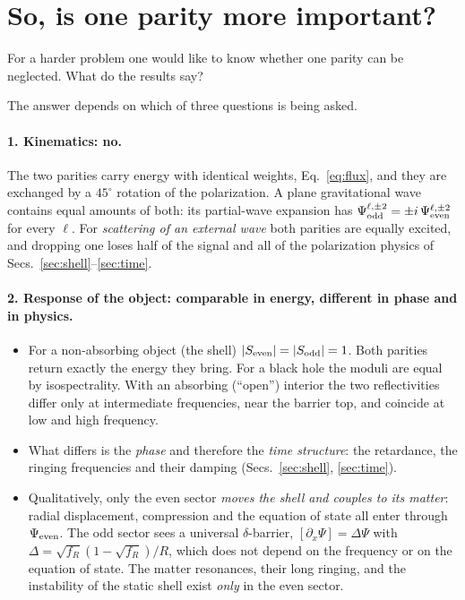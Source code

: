 \section{So, is one parity more important?}\label{sec:which}
\begin{question}
For a harder problem one would like to know whether one parity can be neglected. What do the results say?
\end{question}
The answer depends on which of three questions is being asked.

\paragraph{1. Kinematics: no.} The two parities carry energy with identical weights, Eq.~\eqref{eq:flux}, and they are
exchanged by a $45^\circ$ rotation of the polarization. A plane gravitational wave contains equal amounts of both: its
partial-wave expansion has $\Psi^{\ell,\pm2}_{\rm odd}=\pm i\,\Psi^{\ell,\pm2}_{\rm even}$ for every $\ell$. For \emph{scattering of an
external wave} both parities are equally excited, and dropping one loses half of the signal and all of the
polarization physics of Secs.~\ref{sec:shell}--\ref{sec:time}.

\paragraph{2. Response of the object: comparable in energy, different in phase and in physics.}
\begin{itemize}
\item For a non-absorbing object (the shell) $|S_{\rm even}|=|S_{\rm odd}|=1$. Both parities return exactly the energy they
bring. For a black hole the moduli are equal by isospectrality. With an absorbing (``open'') interior the two
reflectivities differ only at intermediate frequencies, near the barrier top, and coincide at low and high frequency.
\item What differs is the \emph{phase} and therefore the \emph{time structure}: the retardance, the ringing frequencies and
their damping (Secs.~\ref{sec:shell}, \ref{sec:time}).
\item Qualitatively, only the even sector \emph{moves the shell and couples to its matter}: radial displacement,
compression and the equation of state all enter through $\Psi_{\rm even}$. The odd sector sees a universal $\delta$-barrier,
$[\partial_x\Psi]=\Delta\Psi$ with $\Delta=\sqrt{f_R}(1-\sqrt{f_R})/R$, which does not depend on the frequency or on the
equation of state. The matter resonances, their long ringing, and the instability of the static shell exist
\emph{only} in the even sector.
\end{itemize}

